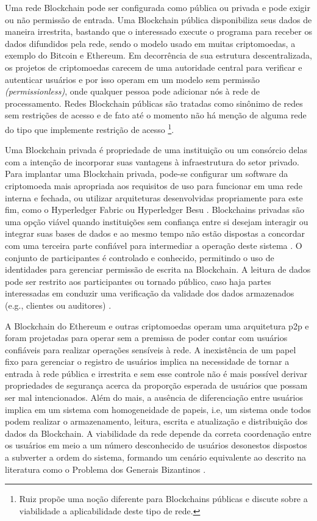 \documentclass[a4paper,11pt]{article}
\begin{document}
Uma rede Blockchain pode ser configurada como pública ou privada e
pode exigir ou não permissão de entrada.%
Uma Blockchain pública disponibiliza seus dados de maneira irrestrita, bastando que o interessado execute o programa para receber os dados difundidos pela rede, sendo o modelo usado em muitas criptomoedas, a exemplo do Bitcoin e Ethereum.
Em decorrência de sua estrutura descentralizada, os projetos de criptomoedas carecem de uma autoridade central para verificar e autenticar usuários e por isso operam em um modelo sem permissão \emph{(permissionless)}, onde qualquer pessoa pode adicionar nós à rede de processamento.
Redes Blockchain públicas são tratadas como sinônimo de redes sem restrições de acesso e de fato até o momento não há menção de alguma rede do tipo que implemente restrição de acesso
\footnote{Ruiz\cite{Ruiz2020} propõe uma noção diferente para Blockchains públicas e discute sobre a viabilidade a aplicabilidade deste tipo de rede.}.

Uma Blockchain privada é propriedade de uma instituição ou um consórcio delas com a intenção de incorporar suas vantagens à infraestrutura do setor privado.
Para implantar uma Blockchain privada, pode-se configurar um software da criptomoeda mais apropriada aos requisitos de uso para funcionar em uma rede interna e fechada, ou utilizar arquiteturas desenvolvidas propriamente para este fim, como o Hyperledger Fabric ou Hyperledger Besu \cite{Blummer2019}.
Blockchains privadas são uma opção viável quando instituições sem confiança entre si desejam interagir ou integrar suas bases de dados e ao mesmo tempo não estão dispostas a concordar com uma terceira parte confiável para intermediar a operação deste sistema \cite{OLeary2017, Wust2017}.
O conjunto de participantes é controlado e conhecido, permitindo o uso de identidades para gerenciar permissão de escrita na Blockchain.
A leitura de dados pode ser restrito aos participantes ou tornado público, caso haja partes interessadas em conduzir uma verificação da validade dos dados armazenados (e.g., clientes ou auditores) .

A Blockchain do Ethereum e outras criptomoedas operam uma arquitetura p2p e foram projetadas para operar sem a premissa de poder contar com usuários confiáveis para realizar operações sensíveis à rede.
A inexistência de um papel fixo para gerenciar o registro de usuários implica na necessidade de tornar a entrada à rede pública e irrestrita e sem esse controle não é mais possível derivar propriedades de segurança acerca da proporção esperada de usuários que possam ser mal intencionados.
Além do mais, a ausência de diferenciação entre usuários implica em um sistema com homogeneidade de papeis, i.e, um sistema onde todos podem realizar o armazenamento, leitura, escrita e atualização e distribuição dos dados da Blockchain.
A viabilidade da rede depende da correta coordenação entre os usuários em meio a um número desconhecido de usuários desonestos dispostos a subverter a ordem do sistema, formando um cenário equivalente ao descrito na literatura como o Problema dos Generais Bizantinos \cite{Lamport1982}.
\end{document}
